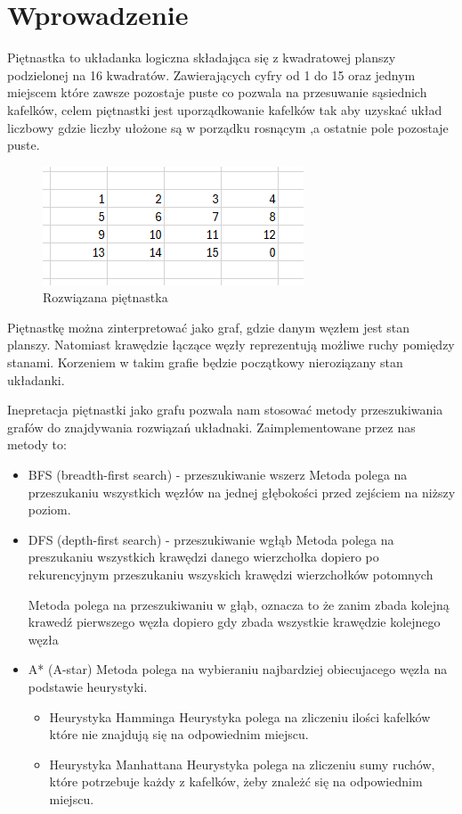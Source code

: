 \documentclass{classrep}
\begin{document}
    \section{Wprowadzenie}
    {
    Piętnastka to układanka logiczna składająca się z kwadratowej
    planszy podzielonej na 16 kwadratów. Zawierających cyfry od 1 do 15 oraz jednym miejscem które zawsze pozostaje puste
    co pozwala na przesuwanie sąsiednich kafelków, celem piętnastki jest uporządkowanie kafelków tak aby uzyskać układ liczbowy
    gdzie liczby ułożone są w porządku rosnącym ,a ostatnie pole pozostaje puste.

    \begin{figure}
        \centering
        \includegraphics{15}
        \caption{Rozwiązana piętnastka}
    \end{figure}

    Piętnastkę można zinterpretować jako graf, gdzie danym węzłem jest stan planszy. Natomiast krawędzie łączące węzły
    reprezentują możliwe ruchy pomiędzy stanami. Korzeniem w takim grafie będzie początkowy nieroziązany stan układanki.

    Inepretacja piętnastki jako grafu pozwala nam stosować metody przeszukiwania grafów do znajdywania rozwiązań układnaki.
    Zaimplementowane przez nas metody to:
        \begin{itemize}
            \item BFS (breadth-first search) - przeszukiwanie wszerz
                Metoda polega na przeszukaniu wszystkich węzłów na jednej głębokości przed zejściem na niższy poziom.
            \item DFS (depth-first search) - przeszukiwanie wgłąb
                Metoda polega na preszukaniu wszystkich krawędzi danego wierzchołka dopiero po rekurencyjnym przeszukaniu
                wszyskich krawędzi wierzchołków potomnych

            Metoda polega na przeszukiwaniu w głąb, oznacza to że zanim zbada kolejną krawedź pierwszego węzła
            dopiero gdy zbada wszystkie krawędzie kolejnego węzła
            \item A* (A-star)
                Metoda polega na wybieraniu najbardziej obiecujacego węzła na podstawie heurystyki.
                \begin{itemize}
                    \item Heurystyka Hamminga
                        Heurystyka polega na zliczeniu ilości kafelków które nie znajdują się na odpowiednim miejscu.
                    \item Heurystyka Manhattana
                        Heurystyka polega na zliczeniu sumy ruchów, które potrzebuje każdy z kafelków, żeby znależć się na odpowiednim miejscu.
                \end{itemize}
        \end{itemize}

    }
\end{document}
